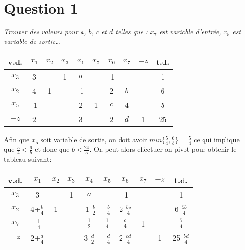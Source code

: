 \section*{Question 1}

\emph{Trouver des valeurs pour $a$, $b$, $c$ et $d$ telles que : $x_7$ est variable d’entrée, $x_5$ est variable de sortie\dots}
\begin{center}
	\renewcommand{\arraystretch}{1.5}
	\begin{tabular}{|c|cccccccc|c|}
		\hline
		v.d.  & $x_1$ & $x_2$ & $x_3$ & $x_4$ & $x_5$ & $x_6$ & $x_7$ & $-z$ & t.d. \\ \hline
		$x_3$ &   3   &       &   1   &  $a$  &       &  -1   &       &      &  1   \\
		$x_2$ &   4   &   1   &       &  -1   &       &   2   &  $b$  &      &  6   \\
		$x_5$ &  -1   &       &       &   2   &   1   &  $c$  &   4   &      &  5   \\ \hline
		$-z$  &   2   &       &       &   3   &       &   2   &  $d$  &  1   &  25  \\ \hline
	\end{tabular}
\end{center}

Afin que $x_5$ soit variable de sortie, on doit avoir $min \{\frac{5}{4}, \frac{6}{b}\}$ = $\frac{5}{4}$ ce qui implique que $\frac{5}{4} < \frac{6}{b}$ et donc que $b < \frac{24}{5}$. On peut alors effectuer on pivot pour obtenir le tableau suivant:

\begin{center}
	\renewcommand{\arraystretch}{1.5}
	\begin{tabular}{|c|cccccccc|c|}
		\hline
		v.d.  &      $x_1$      & $x_2$ & $x_3$ &      $x_4$       &     $x_5$      &      $x_6$       & $x_7$ & $-z$ &       t.d.        \\ \hline
		$x_3$ &        3        &       &   1   &       $a$        &                &        -1        &       &      &         1         \\
		$x_2$ & 4+$\frac{b}{4}$ &   1   &       & -1-$\frac{b}{2}$ & -$\frac{b}{4}$ & 2-$\frac{bc}{4}$ &       &      & 6-$\frac{5b}{4}$  \\
		$x_7$ & -$\frac{1}{4}$  &       &       &  $\frac{1}{2}$   & $\frac{1}{4}$  &  $\frac{c}{4}$   &   1   &      &   $\frac{5}{4}$   \\ \hline
		$-z$  & 2+$\frac{d}{4}$ &       &       & 3-$\frac{d}{2}$  & -$\frac{d}{4}$ & 2-$\frac{cd}{4}$ &       &  1   & 25-$\frac{5d}{4}$ \\ \hline
	\end{tabular}
\end{center}

